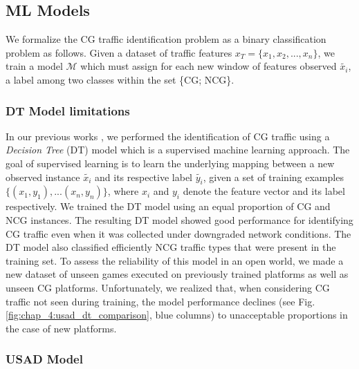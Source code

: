 
\subsection{ML Models}
We formalize the CG traffic identification problem as a binary classification problem as follows. Given a dataset of traffic features $x_T = \{x_1, x_2, ..., x_n\}$, we train a model $\mathcal{M}$ which must assign for each new window of features observed $\tilde{x_i}$, a label among two classes within the set \{CG; NCG\}.%

\subsubsection{DT Model limitations}

In our previous works \cite{NOMS}, we performed the identification of CG traffic using a \textit{Decision Tree} (DT) model which is a supervised machine learning approach. The goal of supervised learning is to learn the underlying mapping between a new observed instance $\tilde{x_i}$ and its respective label $\tilde{y_i}$, given a set of training examples $\{(x_1,y_1), ... (x_n,y_n)\}$, where $x_i$ and $y_i$ denote the feature vector and its label respectively. We trained the DT model using an equal proportion of CG and NCG instances. 
The resulting DT model showed good performance for identifying CG traffic even when it was collected under downgraded network conditions. The DT model also classified efficiently NCG traffic types that were present in the training set. To assess the reliability of this model in an open world, we made a new dataset of unseen games executed on previously trained platforms as well as unseen CG platforms. Unfortunately, we realized that, when considering CG traffic not seen during training, the model performance declines (see Fig. \ref{fig:chap_4:usad_dt_comparison}, blue columns) to unacceptable proportions in the case of new platforms. %

\subsubsection{USAD Model}

